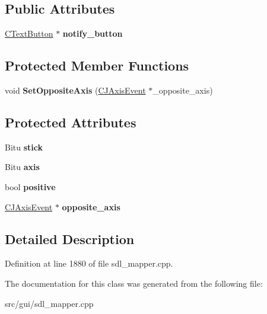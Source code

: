 \subsection*{Public Attributes}
\begin{DoxyCompactItemize}
\item 
\hypertarget{classCJAxisEvent_a44cbf08bc0468daffe05f967810851f0}{\hyperlink{classCTextButton}{C\-Text\-Button} $\ast$ {\bfseries notify\-\_\-button}}\label{classCJAxisEvent_a44cbf08bc0468daffe05f967810851f0}

\end{DoxyCompactItemize}
\subsection*{Protected Member Functions}
\begin{DoxyCompactItemize}
\item 
\hypertarget{classCJAxisEvent_afdb866161b2dc0dd1d8a5331f9d39117}{void {\bfseries Set\-Opposite\-Axis} (\hyperlink{classCJAxisEvent}{C\-J\-Axis\-Event} $\ast$\-\_\-opposite\-\_\-axis)}\label{classCJAxisEvent_afdb866161b2dc0dd1d8a5331f9d39117}

\end{DoxyCompactItemize}
\subsection*{Protected Attributes}
\begin{DoxyCompactItemize}
\item 
\hypertarget{classCJAxisEvent_a4445db17f0538358d815ab53d449beba}{Bitu {\bfseries stick}}\label{classCJAxisEvent_a4445db17f0538358d815ab53d449beba}

\item 
\hypertarget{classCJAxisEvent_aef7080ddb8c0a07235865f4f8f33bf90}{Bitu {\bfseries axis}}\label{classCJAxisEvent_aef7080ddb8c0a07235865f4f8f33bf90}

\item 
\hypertarget{classCJAxisEvent_a90367a0731415ea7dd7b3d01fa153367}{bool {\bfseries positive}}\label{classCJAxisEvent_a90367a0731415ea7dd7b3d01fa153367}

\item 
\hypertarget{classCJAxisEvent_aef506ec736efabf7a118af104921a998}{\hyperlink{classCJAxisEvent}{C\-J\-Axis\-Event} $\ast$ {\bfseries opposite\-\_\-axis}}\label{classCJAxisEvent_aef506ec736efabf7a118af104921a998}

\end{DoxyCompactItemize}


\subsection{Detailed Description}


Definition at line 1880 of file sdl\-\_\-mapper.\-cpp.



The documentation for this class was generated from the following file\-:\begin{DoxyCompactItemize}
\item 
src/gui/sdl\-\_\-mapper.\-cpp\end{DoxyCompactItemize}
